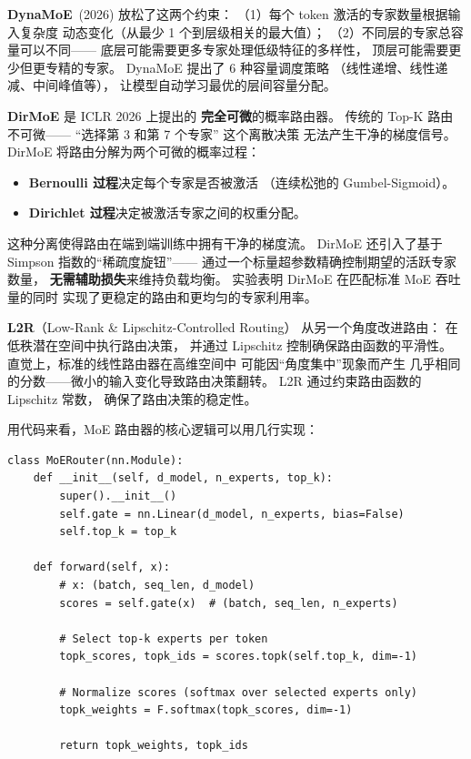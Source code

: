 \textbf{DynaMoE}~(2026) 放松了这两个约束：%
（1）每个 token 激活的专家数量根据输入复杂度
动态变化（从最少 1 个到层级相关的最大值）；
（2）不同层的专家总容量可以不同——
底层可能需要更多专家处理低级特征的多样性，
顶层可能需要更少但更专精的专家。
DynaMoE 提出了 6 种容量调度策略
（线性递增、线性递减、中间峰值等），
让模型自动学习最优的层间容量分配。

\textbf{DirMoE} 是 ICLR 2026 上提出的%
\textbf{完全可微}的概率路由器。
传统的 Top-K 路由不可微——
``选择第 3 和第 7 个专家'' 这个离散决策
无法产生干净的梯度信号。
DirMoE 将路由分解为两个可微的概率过程：
\begin{itemize}[noitemsep]
  \item \textbf{Bernoulli 过程}决定每个专家是否被激活
        （连续松弛的 Gumbel-Sigmoid）。
  \item \textbf{Dirichlet 过程}决定被激活专家之间的权重分配。
\end{itemize}
这种分离使得路由在端到端训练中拥有干净的梯度流。
DirMoE 还引入了基于 Simpson 指数的``稀疏度旋钮''——
通过一个标量超参数精确控制期望的活跃专家数量，
\textbf{无需辅助损失}来维持负载均衡。
实验表明 DirMoE 在匹配标准 MoE 吞吐量的同时
实现了更稳定的路由和更均匀的专家利用率。

\textbf{L2R}（Low-Rank \& Lipschitz-Controlled Routing）%
从另一个角度改进路由：
在低秩潜在空间中执行路由决策，
并通过 Lipschitz 控制确保路由函数的平滑性。
直觉上，标准的线性路由器在高维空间中
可能因``角度集中''现象而产生
几乎相同的分数——微小的输入变化导致路由决策翻转。
L2R 通过约束路由函数的 Lipschitz 常数，
确保了路由决策的稳定性。

用代码来看，MoE 路由器的核心逻辑可以用几行实现：

\begin{lstlisting}[caption={MoE router implementation}]
class MoERouter(nn.Module):
    def __init__(self, d_model, n_experts, top_k):
        super().__init__()
        self.gate = nn.Linear(d_model, n_experts, bias=False)
        self.top_k = top_k

    def forward(self, x):
        # x: (batch, seq_len, d_model)
        scores = self.gate(x)  # (batch, seq_len, n_experts)

        # Select top-k experts per token
        topk_scores, topk_ids = scores.topk(self.top_k, dim=-1)

        # Normalize scores (softmax over selected experts only)
        topk_weights = F.softmax(topk_scores, dim=-1)

        return topk_weights, topk_ids
\end{lstlisting}


